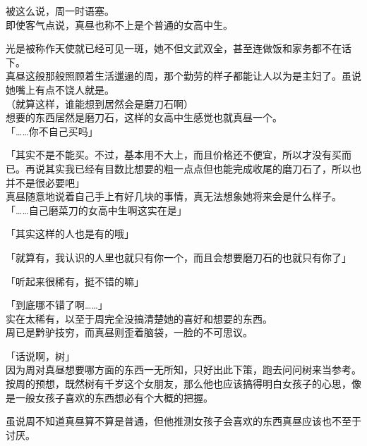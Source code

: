 被这么说，周一时语塞。\\

即使客气点说，真昼也称不上是个普通的女高中生。

光是被称作天使就已经可见一斑，她不但文武双全，甚至连做饭和家务都不在话下。\\

真昼这般那般照顾着生活邋遢的周，那个勤劳的样子都能让人以为是主妇了。虽说她嘴上有点不饶人就是。\\

（就算这样，谁能想到居然会是磨刀石啊）\\

想要的东西居然是磨刀石，这样的女高中生感觉也就真昼一个。\\

「……你不自己买吗」

「其实不是不能买。不过，基本用不大上，而且价格还不便宜，所以才没有买而已。再说其实我已经有目数比想要的粗一点点但也能完成收尾的磨刀石了，所以也并不是很必要吧」\\

真昼随意地说着自己手上有好几块的事情，真无法想象她将来会是什么样子。\\

「……自己磨菜刀的女高中生啊这实在是」

「其实这样的人也是有的哦」

「就算有，我认识的人里也就只有你一个，而且会想要磨刀石的也就只有你了」

「听起来很稀有，挺不错的嘛」

「到底哪不错了啊……」\\

实在太稀有，以至于周完全没搞清楚她的喜好和想要的东西。\\

周已是黔驴技穷，而真昼则歪着脑袋，一脸的不可思议。\\

\vspace{2\baselineskip}

「话说啊，树」\\

因为周对真昼想要哪方面的东西一无所知，只好出此下策，跑去问问树来当参考。\\

按周的预想，既然树有千岁这个女朋友，那么他也应该搞得明白女孩子的心思，像是一般女孩子喜欢的东西想必有个大概的把握。

虽说周不知道真昼算不算是普通，但他推测女孩子会喜欢的东西真昼应该也不至于讨厌。\\

